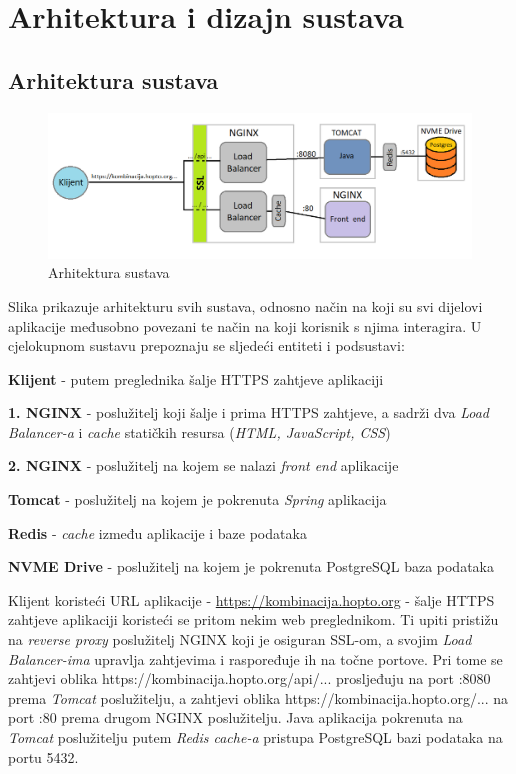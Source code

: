 \chapter{Arhitektura i dizajn sustava}

		\section{Arhitektura sustava}
		\begin{figure}[H]
			\includegraphics[scale=0.5]{figures/system-architecture.png}
			\centering
			\caption{Arhitektura sustava}
			\label{fig:sys-arch}
		\end{figure}
	
		Slika prikazuje arhitekturu svih sustava, odnosno način na koji su svi dijelovi aplikacije međusobno povezani te način na koji korisnik s njima interagira.
		U cjelokupnom sustavu prepoznaju se sljedeći entiteti i podsustavi:
		\begin{packed_item}
			\item \textbf{Klijent} - putem preglednika šalje HTTPS zahtjeve aplikaciji
			\item \textbf{1. NGINX} - poslužitelj koji šalje i prima HTTPS zahtjeve, a sadrži dva \textit{Load Balancer-a} i \textit{cache} statičkih resursa (\textit{HTML, JavaScript, CSS})
			\item \textbf{2. NGINX} - poslužitelj na kojem se nalazi \textit{front end} aplikacije
			\item \textbf{Tomcat} - poslužitelj na kojem je pokrenuta \textit{Spring} aplikacija
			\item \textbf{Redis} - \textit{cache} između aplikacije i baze podataka
			\item \textbf{NVME Drive} - poslužitelj na kojem je pokrenuta PostgreSQL baza podataka
		\end{packed_item}
	
		Klijent koristeći URL aplikacije - \url{https://kombinacija.hopto.org} - šalje HTTPS zahtjeve aplikaciji koristeći se pritom nekim web preglednikom. Ti upiti pristižu na \textit{reverse proxy} poslužitelj NGINX koji je osiguran SSL-om, a svojim \textit{Load Balancer-ima} upravlja zahtjevima i raspoređuje ih na točne portove. Pri tome se zahtjevi oblika https://kombinacija.hopto.org/api/... prosljeđuju na port :8080 prema \textit{Tomcat} poslužitelju, a zahtjevi oblika https://kombinacija.hopto.org/... na port :80 prema drugom NGINX poslužitelju.
		Java aplikacija pokrenuta na \textit{Tomcat} poslužitelju putem \textit{Redis cache-a} pristupa PostgreSQL bazi podataka na portu 5432.
		
